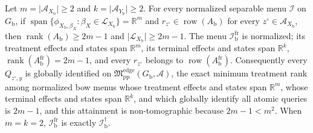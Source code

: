 Let \(m=\lvert\mathcal A_{X_{\mathrm b}}\rvert\ge2\) and \(k=\lvert\mathcal A_{Y_{\mathrm b}}\rvert\ge2\).  For every normalized separable menu \(\mathcal I\) on \(G_{\mathrm b}\), if \(\operatorname{span}\{\phi_{X_{\mathrm b},\beta_X}:\beta_X\in\mathcal L_{X_{\mathrm b}}\}=\mathbb R^m\) and \(r_{z^{\circ}}\in\operatorname{row}(A_{\mathrm b})\) for every \(z^{\circ}\in\mathcal A_{X_{\mathrm b}}\), then \(\operatorname{rank}(A_{\mathrm b})\ge2m-1\) and \(\lvert\mathcal L_{X_{\mathrm b}}\rvert\ge2m-1\).  The menu \(\mathcal I_{\mathrm b}^{\mathrm{fr}}\) is normalized; its treatment effects and states span \(\mathbb R^m\), its terminal effects and states span \(\mathbb R^k\), \(\operatorname{rank}(A_{\mathrm b}^{\mathrm{fr}})=2m-1\), and every \(r_{z^{\circ}}\) belongs to \(\operatorname{row}(A_{\mathrm b}^{\mathrm{fr}})\).  Consequently every \(Q_{z^{\circ},y}\) is globally identified on \(\mathfrak M_{\mathrm{pp}}^{\mathrm{edge}}(G_{\mathrm b},\mathcal A)\), the exact minimum treatment rank among normalized bow menus whose treatment effects and states span \(\mathbb R^m\), whose terminal effects and states span \(\mathbb R^k\), and which globally identify all atomic queries is \(2m-1\), and this attainment is non-tomographic because \(2m-1<m^2\).  When \(m=k=2\), \(\mathcal I_{\mathrm b}^{\mathrm{fr}}\) is exactly \(\mathcal I_{\mathrm b}^{\dagger}\).